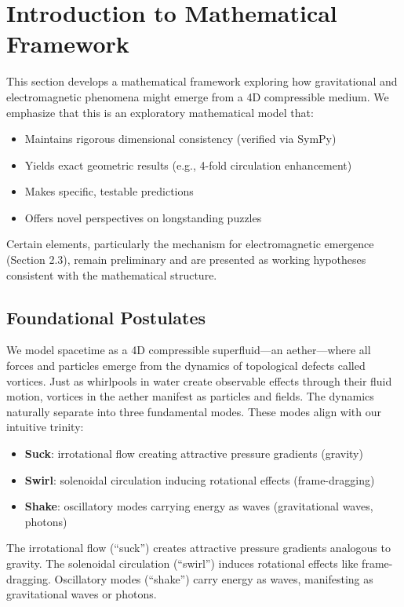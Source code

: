 \section{Introduction to Mathematical Framework}

This section develops a mathematical framework exploring how gravitational and electromagnetic phenomena might emerge from a 4D compressible medium. We emphasize that this is an exploratory mathematical model that:
\begin{itemize}
\item Maintains rigorous dimensional consistency (verified via SymPy)
\item Yields exact geometric results (e.g., 4-fold circulation enhancement)
\item Makes specific, testable predictions
\item Offers novel perspectives on longstanding puzzles
\end{itemize}
Certain elements, particularly the mechanism for electromagnetic emergence (Section 2.3), remain preliminary and are presented as working hypotheses consistent with the mathematical structure.

\subsection{Foundational Postulates}

We model spacetime as a 4D compressible superfluid---an aether---where all forces and particles emerge from the dynamics of topological defects called vortices. Just as whirlpools in water create observable effects through their fluid motion, vortices in the aether manifest as particles and fields. The dynamics naturally separate into three fundamental modes. These modes align with our intuitive trinity:
\begin{itemize}
\item \textbf{Suck}: irrotational flow creating attractive pressure gradients (gravity)
\item \textbf{Swirl}: solenoidal circulation inducing rotational effects (frame-dragging)
\item \textbf{Shake}: oscillatory modes carrying energy as waves (gravitational waves, photons)
\end{itemize}
The irrotational flow (``suck'') creates attractive pressure gradients analogous to gravity. The solenoidal circulation (``swirl'') induces rotational effects like frame-dragging. Oscillatory modes (``shake'') carry energy as waves, manifesting as gravitational waves or photons.

